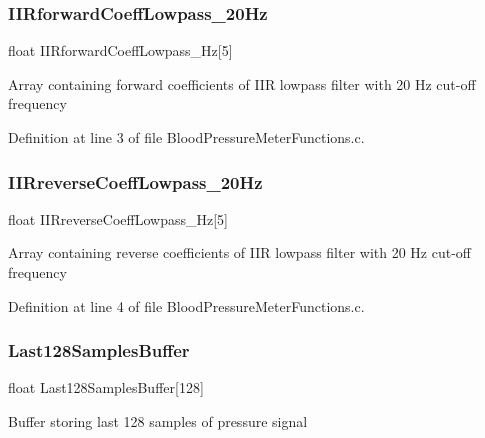 \subsubsection{\texorpdfstring{IIRforwardCoeffLowpass\_20Hz}{IIRforwardCoeffLowpass\_20Hz}}
{\footnotesize\ttfamily float I\+I\+Rforward\+Coeff\+Lowpass\+\_\+Hz\mbox{[}5\mbox{]}}

Array containing forward coefficients of I\+IR lowpass filter with 20 Hz cut-\/off frequency 

Definition at line 3 of file Blood\+Pressure\+Meter\+Functions.\+c.

\mbox{\label{group___blood_pressure_meter_functions_gaddb6d7546a8db3fa284d91704a0b65db_gaddb6d7546a8db3fa284d91704a0b65db}} 
\subsubsection{\texorpdfstring{IIRreverseCoeffLowpass\_20Hz}{IIRreverseCoeffLowpass\_20Hz}}
{\footnotesize\ttfamily float I\+I\+Rreverse\+Coeff\+Lowpass\+\_\+Hz\mbox{[}5\mbox{]}}

Array containing reverse coefficients of I\+IR lowpass filter with 20 Hz cut-\/off frequency 

Definition at line 4 of file Blood\+Pressure\+Meter\+Functions.\+c.

\mbox{\label{group___blood_pressure_meter_functions_ga0d23611e28c2af8552ef0fdf90acb469_ga0d23611e28c2af8552ef0fdf90acb469}} 
\subsubsection{\texorpdfstring{Last128SamplesBuffer}{Last128SamplesBuffer}}
{\footnotesize\ttfamily float Last128\+Samples\+Buffer\mbox{[}128\mbox{]}}

Buffer storing last 128 samples of pressure signal

